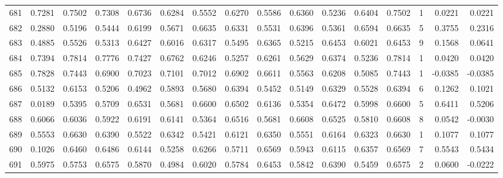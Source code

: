 \begin{tabular}{lrrrrrrrrrrrrrrr}
681 &      0.7281 &  0.7502 &  0.7308 &  0.6736 &  0.6284 &  0.5552 &  0.6270 &  0.5586 &  0.6360 &  0.5236 &   0.6404 &     0.7502 &      1 &                    0.0221 &                     0.0221 \\
682 &      0.2880 &  0.5196 &  0.5444 &  0.6199 &  0.5671 &  0.6635 &  0.6331 &  0.5531 &  0.6396 &  0.5361 &   0.6594 &     0.6635 &      5 &                    0.3755 &                     0.2316 \\
683 &      0.4885 &  0.5526 &  0.5313 &  0.6427 &  0.6016 &  0.6317 &  0.5495 &  0.6365 &  0.5215 &  0.6453 &   0.6021 &     0.6453 &      9 &                    0.1568 &                     0.0641 \\
684 &      0.7394 &  0.7814 &  0.7776 &  0.7427 &  0.6762 &  0.6246 &  0.5257 &  0.6261 &  0.5629 &  0.6374 &   0.5236 &     0.7814 &      1 &                    0.0420 &                     0.0420 \\
685 &      0.7828 &  0.7443 &  0.6900 &  0.7023 &  0.7101 &  0.7012 &  0.6902 &  0.6611 &  0.5563 &  0.6208 &   0.5085 &     0.7443 &      1 &                   -0.0385 &                    -0.0385 \\
686 &      0.5132 &  0.6153 &  0.5206 &  0.4962 &  0.5893 &  0.5680 &  0.6394 &  0.5452 &  0.5149 &  0.6329 &   0.5528 &     0.6394 &      6 &                    0.1262 &                     0.1021 \\
687 &      0.0189 &  0.5395 &  0.5709 &  0.6531 &  0.5681 &  0.6600 &  0.6502 &  0.6136 &  0.5354 &  0.6472 &   0.5998 &     0.6600 &      5 &                    0.6411 &                     0.5206 \\
688 &      0.6066 &  0.6036 &  0.5922 &  0.6191 &  0.6141 &  0.5364 &  0.6516 &  0.5681 &  0.6608 &  0.6525 &   0.5810 &     0.6608 &      8 &                    0.0542 &                    -0.0030 \\
689 &      0.5553 &  0.6630 &  0.6390 &  0.5522 &  0.6342 &  0.5421 &  0.6121 &  0.6350 &  0.5551 &  0.6164 &   0.6323 &     0.6630 &      1 &                    0.1077 &                     0.1077 \\
690 &      0.1026 &  0.6460 &  0.6486 &  0.6144 &  0.5258 &  0.6266 &  0.5711 &  0.6569 &  0.5943 &  0.6115 &   0.6357 &     0.6569 &      7 &                    0.5543 &                     0.5434 \\
691 &      0.5975 &  0.5753 &  0.6575 &  0.5870 &  0.4984 &  0.6020 &  0.5784 &  0.6453 &  0.5842 &  0.6390 &   0.5459 &     0.6575 &      2 &                    0.0600 &                    -0.0222 \\

\end{tabular}
